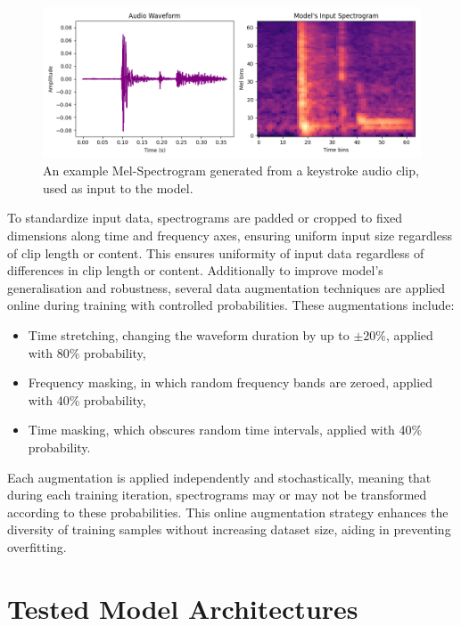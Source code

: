 \documentclass[a4paper,11pt,twoside]{report}
\theoremstyle{definition}
\begin{document}
\begin{figure}[h!]
  \centering
  \includegraphics[width=\textwidth]{img_methodology/model_input.png}
  \caption{An example Mel-Spectrogram generated from a keystroke audio clip, used as input to the model.}
  \label{fig:spectrogram_example}
\end{figure}


To standardize input data, spectrograms are padded or cropped to fixed dimensions along time and frequency axes, ensuring uniform input size regardless of clip length or content. This ensures uniformity of input data regardless of differences in clip length or content. Additionally to improve model's generalisation and robustness, several data augmentation techniques are applied online during training with controlled probabilities. These augmentations include:
\begin{itemize}
    \item Time stretching, changing the waveform duration by up to $ \pm 20\% $, applied with 80\% probability,
    \item Frequency masking, in which random frequency bands are zeroed, applied with 40\% probability,
    \item Time masking, which obscures random time intervals, applied with 40\% probability.
\end{itemize}
Each augmentation is applied independently and stochastically, meaning that during each training iteration, spectrograms may or may not be transformed according to these probabilities. This online augmentation strategy enhances the diversity of training samples without increasing dataset size, aiding in preventing overfitting.

\section{Tested Model Architectures}
\end{document}
